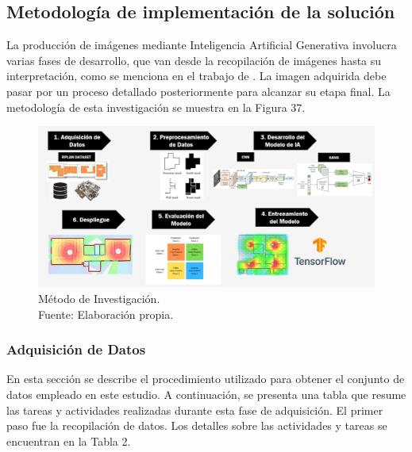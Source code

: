\subsection{Metodología de implementación de la solución}

La producción de imágenes mediante Inteligencia Artificial Generativa involucra varias fases de desarrollo, que van desde la recopilación de imágenes hasta su interpretación, como se menciona en el trabajo de \cite{tec_kingma2019variat}. La imagen adquirida debe pasar por un proceso detallado posteriormente para alcanzar su etapa final. La metodología de esta investigación se muestra en la Figura 37.

\begin{figure}[h]
	\begin{center}
		\includegraphics[width=1.1\textwidth]{3/figures/metodologia.jpg}
		\caption[Método de Investigación]{Método de Investigación.\\
			Fuente: Elaboración propia.}
		\label{3:fig2}
	\end{center}
\end{figure}

\newpage
\subsubsection{Adquisición de Datos}

En esta sección se describe el procedimiento utilizado para obtener el conjunto de datos empleado en este estudio. A continuación, se presenta una tabla que resume las tareas y actividades realizadas durante esta fase de adquisición. El primer paso fue la recopilación de datos. Los detalles sobre las actividades y tareas se encuentran en la Tabla 2.

